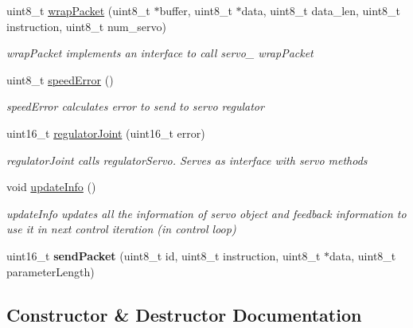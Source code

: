 \begin{DoxyCompactItemize}
\item 
uint8\+\_\+t \hyperlink{classJointRHA_a2699a5c23fc45d929af0be9d9b985828}{wrap\+Packet} (uint8\+\_\+t $\ast$buffer, uint8\+\_\+t $\ast$data, uint8\+\_\+t data\+\_\+len, uint8\+\_\+t instruction, uint8\+\_\+t num\+\_\+servo)
\begin{DoxyCompactList}\small\item\em wrap\+Packet implements an interface to call servo\+\_\+ wrap\+Packet \end{DoxyCompactList}\item 
uint8\+\_\+t \hyperlink{classJointRHA_a9dc4da0e2989efde76f0a13b24d67dee}{speed\+Error} ()
\begin{DoxyCompactList}\small\item\em speed\+Error calculates error to send to servo regulator \end{DoxyCompactList}\item 
uint16\+\_\+t \hyperlink{classJointRHA_ac12ae19170553a71dc1ac2328ecdefe1}{regulator\+Joint} (uint16\+\_\+t error)
\begin{DoxyCompactList}\small\item\em regulator\+Joint calls regulator\+Servo. Serves as interface with servo methods \end{DoxyCompactList}\item 
void \hyperlink{classJointRHA_ab3e0a845b387b5ef171a56c1e4d05e92}{update\+Info} ()\hypertarget{classJointRHA_ab3e0a845b387b5ef171a56c1e4d05e92}{}\label{classJointRHA_ab3e0a845b387b5ef171a56c1e4d05e92}

\begin{DoxyCompactList}\small\item\em update\+Info updates all the information of servo object and feedback information to use it in next control iteration (in control loop) \end{DoxyCompactList}\item 
uint16\+\_\+t {\bfseries send\+Packet} (uint8\+\_\+t id, uint8\+\_\+t instruction, uint8\+\_\+t $\ast$data, uint8\+\_\+t parameter\+Length)\hypertarget{classJointRHA_adb3b8514cc4a3311b06188b2ff3a6378}{}\label{classJointRHA_adb3b8514cc4a3311b06188b2ff3a6378}

\end{DoxyCompactItemize}


\subsection{Constructor \& Destructor Documentation}

